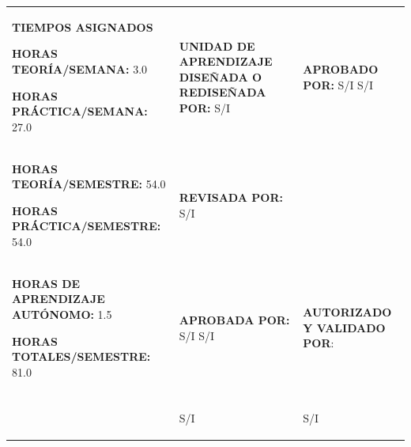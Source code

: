 \documentclass[10pt]{article}
\begin{document}
\begin{table}[H]
  \begin{tabular}{|p{}|p{}|p{}|}
    \hline
    \centering
    \textbf{TIEMPOS ASIGNADOS}

    \raggedright
    \textbf{HORAS TEORÍA/SEMANA:} 3.0

    \textbf{HORAS PRÁCTICA/SEMANA:} 27.0
    & 
    \textbf{UNIDAD DE APRENDIZAJE DISEÑADA O REDISEÑADA POR: } S/I 
    &
    \textbf{APROBADO POR:} S/I
    S/I
    \\
    \textbf{HORAS TEORÍA/SEMESTRE:} 54.0
    \raggedright
    \textbf{HORAS PRÁCTICA/SEMESTRE:} 54.0
    & 
    \textbf{REVISADA POR:} S/I
    &\\ 
    \textbf{HORAS DE APRENDIZAJE AUTÓNOMO:} 1.5

    \textbf{HORAS TOTALES/SEMESTRE:} 81.0
    & 
    \textbf{APROBADA POR:} S/I
    S/I & 
    \textbf{AUTORIZADO Y VALIDADO POR}:\\& &\\ & \hline
    \begin{center}S/I\end{center} & \hline

    \begin{center}S/I\end{center}\\ 
    \hline
  \end{tabular}
\end{table}

\end{document}
